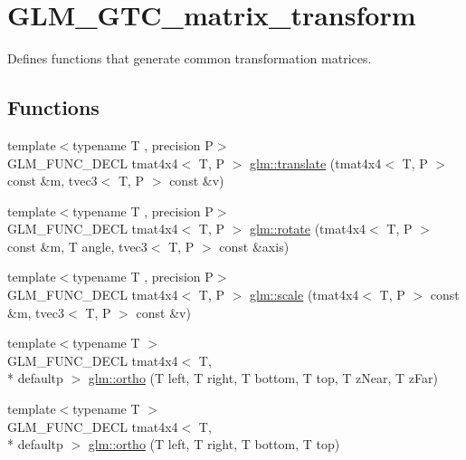 \hypertarget{group__gtc__matrix__transform}{\section{G\-L\-M\-\_\-\-G\-T\-C\-\_\-matrix\-\_\-transform}
\label{group__gtc__matrix__transform}
}


Defines functions that generate common transformation matrices.  


\subsection*{Functions}
\begin{DoxyCompactItemize}
\item 
{\footnotesize template$<$typename T , precision P$>$ }\\G\-L\-M\-\_\-\-F\-U\-N\-C\-\_\-\-D\-E\-C\-L tmat4x4$<$ T, P $>$ \hyperlink{group__gtc__matrix__transform_gaee134ab77c6c5548a6ebf4e8e476c6ed}{glm\-::translate} (tmat4x4$<$ T, P $>$ const \&m, tvec3$<$ T, P $>$ const \&v)
\item 
{\footnotesize template$<$typename T , precision P$>$ }\\G\-L\-M\-\_\-\-F\-U\-N\-C\-\_\-\-D\-E\-C\-L tmat4x4$<$ T, P $>$ \hyperlink{group__gtc__matrix__transform_ga161b1df124348f232d994ba7958e4815}{glm\-::rotate} (tmat4x4$<$ T, P $>$ const \&m, T angle, tvec3$<$ T, P $>$ const \&axis)
\item 
{\footnotesize template$<$typename T , precision P$>$ }\\G\-L\-M\-\_\-\-F\-U\-N\-C\-\_\-\-D\-E\-C\-L tmat4x4$<$ T, P $>$ \hyperlink{group__gtc__matrix__transform_ga8f062fcc07e2445500793f2803afebb0}{glm\-::scale} (tmat4x4$<$ T, P $>$ const \&m, tvec3$<$ T, P $>$ const \&v)
\item 
{\footnotesize template$<$typename T $>$ }\\G\-L\-M\-\_\-\-F\-U\-N\-C\-\_\-\-D\-E\-C\-L tmat4x4$<$ T, \\*
defaultp $>$ \hyperlink{group__gtc__matrix__transform_ga65280251de6e38580110a0577a43d8f8}{glm\-::ortho} (T left, T right, T bottom, T top, T z\-Near, T z\-Far)
\item 
{\footnotesize template$<$typename T $>$ }\\G\-L\-M\-\_\-\-F\-U\-N\-C\-\_\-\-D\-E\-C\-L tmat4x4$<$ T, \\*
defaultp $>$ \hyperlink{group__gtc__matrix__transform_ga45b1b64f99255c07119b4f1aaed04dd7}{glm\-::ortho} (T left, T right, T bottom, T top)

\end{DoxyCompactItemize}
